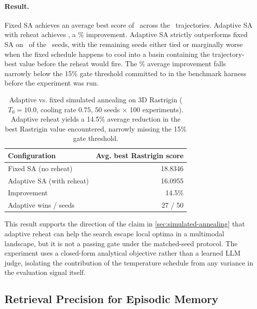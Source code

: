 \paragraph{Result.}
Fixed SA achieves an average best score of \saFixedAvg\ across the \saTotalSeeds\ trajectories.
Adaptive SA with reheat achieves \saAdaptiveAvg, a \saImprovementPct\% improvement.
Adaptive SA strictly outperforms fixed SA on \saAdaptiveWins\ of the \saTotalSeeds\ seeds, with the remaining seeds either tied or marginally worse when the fixed schedule happens to cool into a basin containing the trajectory-best value before the reheat would fire.
The \saImprovementPct\% average improvement falls narrowly below the 15\% gate threshold committed to in the benchmark harness before the experiment was run.

\begin{table}[t]
  \centering
  \caption{Adaptive vs. fixed simulated annealing on 3D Rastrigin ($T_0 = 10.0$, cooling rate $0.75$, 50 seeds $\times$ 100 experiments). Adaptive reheat yields a 14.5\% average reduction in the best Rastrigin value encountered, narrowly missing the 15\% gate threshold.}
  \label{tab:gate-sa}
  \small
  \begin{tabular}{@{}lr@{}}
    \toprule
    Configuration & Avg. best Rastrigin score \\
    \midrule
    Fixed SA (no reheat) & 18.8346 \\
    Adaptive SA (with reheat) & 16.0955 \\
    \midrule
    Improvement & 14.5\% \\
    Adaptive wins / seeds & 27 / 50 \\
    \bottomrule
  \end{tabular}
\end{table}

This result supports the direction of the claim in \cref{sec:simulated-annealing} that adaptive reheat can help the search escape local optima in a multimodal landscape, but it is not a passing gate under the matched-seed protocol.
The experiment uses a closed-form analytical objective rather than a learned LLM judge, isolating the contribution of the temperature schedule from any variance in the evaluation signal itself.

\subsection{Retrieval Precision for Episodic Memory}
\label{sec:gate-retrieval}

